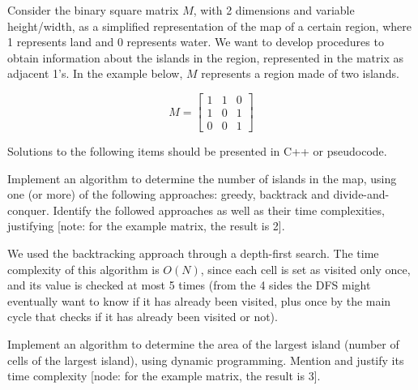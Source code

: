 {\begin{center}
\end{center}


Consider the binary square matrix $M$, with 2 dimensions and variable height/width, as a simplified representation of the map of a certain region, where 1 represents land and 0 represents water. We want to develop procedures to obtain information about the islands in the region, represented in the matrix as adjacent 1's. In the example below, $M$ represents a region made of two islands.

\begin{equation*}
    M = \begin{bmatrix}
        1 & 1 & 0 \\
        1 & 0 & 1 \\
        0 & 0 & 1
    \end{bmatrix}
\end{equation*}

Solutions to the following items should be presented in C++ or pseudocode.

Implement an algorithm to determine the number of islands in the map, using one (or more) of the following approaches: greedy, backtrack and divide-and-conquer. Identify the followed approaches as well as their time complexities, justifying [note: for the example matrix, the result is 2].

\ansseparator



We used the backtracking approach through a depth-first search. The time complexity of this algorithm is $O(N)$, since each cell is set as visited only once, and its value is checked at most 5 times (from the 4 sides the DFS might eventually want to know if it has already been visited, plus once by the main cycle that checks if it has already been visited or not).

Implement an algorithm to determine the area of the largest island (number of cells of the largest island), using dynamic programming. Mention and justify its time complexity [node: for the example matrix, the result is 3].

}
